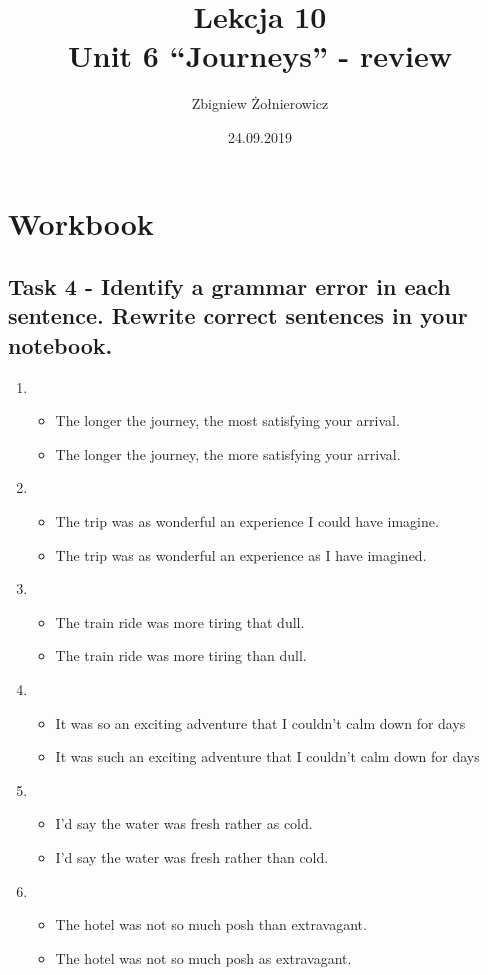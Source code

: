 \documentclass[a4paper]{article}
\begin{document}
\title{{\huge Lekcja 10} \\
{\large Unit 6 ``Journeys'' - review}}
\author{Zbigniew Żołnierowicz}
\date{24.09.2019}
\maketitle
\section{Workbook}
\subsection{Task 4 - Identify a grammar error in each sentence. Rewrite correct sentences in your notebook.}
\begin{enumerate}
    \item \begin{itemize}
        \item The longer the journey, the most satisfying your arrival.
        \item The longer the journey, the more satisfying your arrival.
    \end{itemize}
    \item \begin{itemize}
        \item The trip was as wonderful an experience I could have imagine.
        \item The trip was as wonderful an experience as I have imagined.
    \end{itemize}
    \item \begin{itemize}
        \item The train ride was more tiring that dull.
        \item The train ride was more tiring than dull.
    \end{itemize}
    \item \begin{itemize}
        \item It was so an exciting adventure that I couldn't calm down for days
        \item It was such an exciting adventure that I couldn't calm down for days
    \end{itemize}
    \item \begin{itemize}
        \item I'd say the water was fresh rather as cold.
        \item I'd say the water was fresh rather than cold.
    \end{itemize}
    \item \begin{itemize}
        \item The hotel was not so much posh than extravagant.
        \item The hotel was not so much posh as extravagant.
    \end{itemize}
\end{enumerate}
\end{document}
